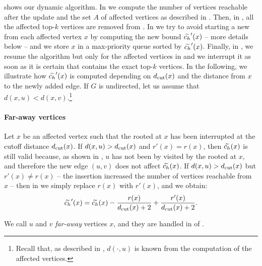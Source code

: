  shows our dynamic algorithm. In
 we compute the number
of vertices reachable after the update and the set $A$ of affected vertices
as described in .
Then, in ,
all the affected top-$k$ vertices are removed from \topk.
In  we
try to avoid starting a new \bfscut from each affected vertex $x$ by
computing the new bound $\widetilde{c_h}'(x)$ -- more details below --
and we store $x$ in a max-priority queue \prioq
sorted by $\widetilde{c_h}'(x)$. Finally, in
, we resume the \nbcut
algorithm but only for the affected vertices in \prioq and we interrupt it as soon as it
is certain that \topk contains the exact top-$k$ vertices.
In the following, we illustrate how $\widetilde{c_h}'(x)$ is computed depending on $d_{\text{cut}}(x)$
and the distance from $x$ to the newly added edge.
If $G$ is undirected, let us assume \wilog that
$d(x, u) < d(x, v)$.\footnote{Recall that, as described in
, $d(\cdot, u)$ is known from the computation
of the affected vertices.}

\paragraph{Far-away vertices}
%
Let $x$ be an affected vertex such that the \bfscut rooted at $x$ has been interrupted
at the cutoff distance $d_{\text{cut}}(x)$.
If $d(x, u) > d_{\text{cut}}(x)$ and $r'(x) = r(x)$, then $\widetilde{c_h}(x)$ is still valid because,
as shown in , $u$ has not been by visited by the
\bfscut rooted at $x$, and therefore the new edge $(u, v)$ does not affect
$\widetilde{c_h}(x)$.
If $d(x, u) > d_{\text{cut}}(x)$ but $r'(x) \neq r(x)$ -- \ie the insertion increased the
number of vertices reachable from $x$ -- then in  we simply replace
$r(x)$ with $r'(x)$, and we obtain:
%
\[
\widetilde{c_h}'(x) = \widetilde{c_h}(x) - \frac{r(x)}{d_{\text{cut}}(x) + 2} + \frac{r'(x)}{d_{\text{cut}}(x) + 2}.
\]

We call $u$ and $v$ \emph{far-away} vertices \wrt $x$, and they are handled
in  of .

